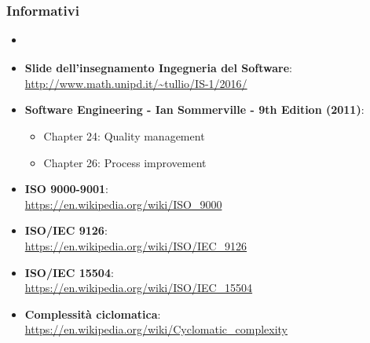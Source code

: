 \subsubsection{Informativi}
\begin{itemize}
	\item \textbf{\PianoDiProgetto}
	\item \textbf{Slide dell'insegnamento Ingegneria del Software}:\\
	\url{http://www.math.unipd.it/~tullio/IS-1/2016/}
	\item \textbf{Software Engineering - Ian Sommerville - 9th Edition (2011)}:
	\begin{itemize}
		\item Chapter 24: Quality management
		\item Chapter 26: Process improvement
	\end{itemize}
	\item \textbf{ISO 9000-9001}:\\
	\url{https://en.wikipedia.org/wiki/ISO_9000}
	\item \textbf{ISO/IEC 9126}:\\
	\url{https://en.wikipedia.org/wiki/ISO/IEC_9126}
	\item  \textbf{ISO/IEC 15504}:\\
	\url{https://en.wikipedia.org/wiki/ISO/IEC_15504}
	\item \textbf{Complessità ciclomatica}:\\
	\url{https://en.wikipedia.org/wiki/Cyclomatic_complexity}
	
	
\end{itemize}
